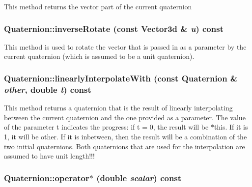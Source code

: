 \label{classCartWheel_1_1Math_1_1Quaternion_a1ce2ae630d5e8c7eae0c0fcb2e501ea3}
This method returns the vector part of the current quaternion \hypertarget{classCartWheel_1_1Math_1_1Quaternion_a1d7ded1abcb1370373dd97dc4d40b9cb}{
\subsubsection[{inverseRotate}]{ Quaternion::inverseRotate (const {\bf Vector3d} \& {\em u}) const}}
\label{classCartWheel_1_1Math_1_1Quaternion_a1d7ded1abcb1370373dd97dc4d40b9cb}
This method is used to rotate the vector that is passed in as a parameter by the current quaternion (which is assumed to be a unit quaternion). \hypertarget{classCartWheel_1_1Math_1_1Quaternion_a78fcba74485cb0c364b8f06c983f8d8c}{
\subsubsection[{linearlyInterpolateWith}]{ Quaternion::linearlyInterpolateWith (const {\bf Quaternion} \& {\em other}, \/  double {\em t}) const}}
\label{classCartWheel_1_1Math_1_1Quaternion_a78fcba74485cb0c364b8f06c983f8d8c}
This method returns a quaternion that is the result of linearly interpolating between the current quaternion and the one provided as a parameter. The value of the parameter t indicates the progress: if t = 0, the result will be $\ast$this. If it is 1, it will be other. If it is inbetween, then the result will be a combination of the two initial quaternions. Both quaternions that are used for the interpolation are assumed to have unit length!!! \hypertarget{classCartWheel_1_1Math_1_1Quaternion_acc184b31d51f8c0289d3e2b8480f417c}{
\subsubsection[{operator$\ast$}]{ Quaternion::operator$\ast$ (double {\em scalar}) const}}

